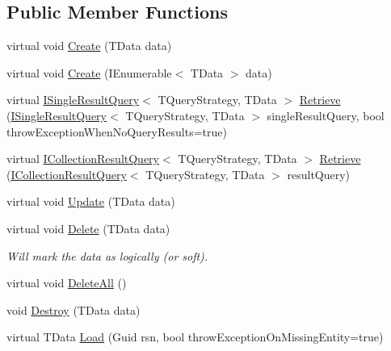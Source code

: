 \subsection*{Public Member Functions}
\begin{DoxyCompactItemize}
\item 
virtual void \hyperlink{classCqrs_1_1Repositories_1_1Repository_a5d5d78262533aa2ab32eddbab83869bd_a5d5d78262533aa2ab32eddbab83869bd}{Create} (T\+Data data)
\item 
virtual void \hyperlink{classCqrs_1_1Repositories_1_1Repository_a2af8103cc2946317f8ee9ede643bbc68_a2af8103cc2946317f8ee9ede643bbc68}{Create} (I\+Enumerable$<$ T\+Data $>$ data)
\item 
virtual \hyperlink{interfaceCqrs_1_1Repositories_1_1Queries_1_1ISingleResultQuery}{I\+Single\+Result\+Query}$<$ T\+Query\+Strategy, T\+Data $>$ \hyperlink{classCqrs_1_1Repositories_1_1Repository_a4f83093a92d8141cdc2b908bbbd97f32_a4f83093a92d8141cdc2b908bbbd97f32}{Retrieve} (\hyperlink{interfaceCqrs_1_1Repositories_1_1Queries_1_1ISingleResultQuery}{I\+Single\+Result\+Query}$<$ T\+Query\+Strategy, T\+Data $>$ single\+Result\+Query, bool throw\+Exception\+When\+No\+Query\+Results=true)
\item 
virtual \hyperlink{interfaceCqrs_1_1Repositories_1_1Queries_1_1ICollectionResultQuery}{I\+Collection\+Result\+Query}$<$ T\+Query\+Strategy, T\+Data $>$ \hyperlink{classCqrs_1_1Repositories_1_1Repository_ab1136a454f981848d49e0d0a2f4b6a2f_ab1136a454f981848d49e0d0a2f4b6a2f}{Retrieve} (\hyperlink{interfaceCqrs_1_1Repositories_1_1Queries_1_1ICollectionResultQuery}{I\+Collection\+Result\+Query}$<$ T\+Query\+Strategy, T\+Data $>$ result\+Query)
\item 
virtual void \hyperlink{classCqrs_1_1Repositories_1_1Repository_a893276506e64034992d2c29d5ef11100_a893276506e64034992d2c29d5ef11100}{Update} (T\+Data data)
\item 
virtual void \hyperlink{classCqrs_1_1Repositories_1_1Repository_ac9d88baa6afcea85553fd233ba406e48_ac9d88baa6afcea85553fd233ba406e48}{Delete} (T\+Data data)
\begin{DoxyCompactList}\small\item\em Will mark the {\itshape data}  as logically (or soft). \end{DoxyCompactList}\item 
virtual void \hyperlink{classCqrs_1_1Repositories_1_1Repository_a6b6b50d476a351fc7fbd194cb8fa44d0_a6b6b50d476a351fc7fbd194cb8fa44d0}{Delete\+All} ()
\item 
void \hyperlink{classCqrs_1_1Repositories_1_1Repository_a6ed69cb5542164d9de81b0fa8a549d3e_a6ed69cb5542164d9de81b0fa8a549d3e}{Destroy} (T\+Data data)
\item 
virtual T\+Data \hyperlink{classCqrs_1_1Repositories_1_1Repository_a444e9dfe4710be90940dbb6dec9d856f_a444e9dfe4710be90940dbb6dec9d856f}{Load} (Guid rsn, bool throw\+Exception\+On\+Missing\+Entity=true)
\end{DoxyCompactItemize}
